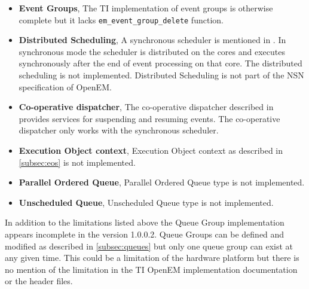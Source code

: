 \begin{itemize}
    \item \textbf{Event Groups},
        The TI implementation of event groups is otherwise complete but it lacks \texttt{em\_event\_group\_delete} function.
    \item \textbf{Distributed Scheduling},
        A synchronous scheduler is mentioned in \cite{openemwhite}. In synchronous mode the scheduler is distributed on the cores and executes synchronously after the end of event processing on that core. The distributed scheduling is not implemented. Distributed Scheduling is not part of the NSN specification of OpenEM.
    \item \textbf{Co-operative dispatcher},
        The co-operative dispatcher described in \cite{openemwhite} provides services for suspending and resuming events. The co-operative dispatcher only works with the synchronous scheduler.
    \item \textbf{Execution Object context},
        Execution Object context as described in \ref{subsec:eos} is not implemented.
    \item \textbf{Parallel Ordered Queue},
        Parallel Ordered Queue type is not implemented.
    \item \textbf{Unscheduled Queue},
        Unscheduled Queue type is not implemented.
\end{itemize}

In addition to the limitations listed above the Queue Group implementation appears incomplete in the version 1.0.0.2. Queue Groups can be defined and modified as described in \ref{subsec:queues} but only one queue group can exist at any given time. This could be a limitation of the hardware platform but there is no mention of the limitation in the TI OpenEM implementation documentation or the header files.

